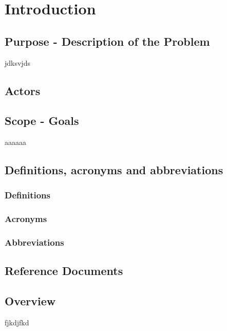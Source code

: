 \section{Introduction}
	\subsection{Purpose - Description of the Problem}
	jdksvjds
	\subsection{Actors}
	\subsection{Scope - Goals}
	aaaaaa
	\subsection{Definitions, acronyms and abbreviations}
		\subsubsection{Definitions}
		\subsubsection{Acronyms}
		\subsubsection{Abbreviations}
	\subsection{Reference Documents}
	\subsection{Overview}
	fjkdjfkd
	